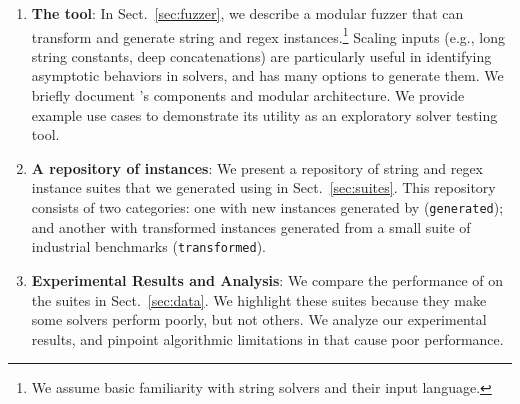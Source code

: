 \begin{enumerate}
    \item \textbf{The \fuzzer{} tool}:
        In Sect.~\ref{sec:fuzzer}, we describe a modular fuzzer that can
        transform and generate \smtfull{} string and regex
        instances.\footnote{We assume basic
        familiarity with string solvers and their input
        language.} Scaling inputs (e.g., long string constants,
        deep concatenations) are particularly useful in identifying asymptotic
        behaviors in solvers, and \fuzzer{} has many options to generate them.
        We briefly document \fuzzer{}'s components and modular architecture.
        We provide example use cases to demonstrate its utility as an
        exploratory solver testing tool.

    \item \textbf{A repository of \smtfull{} instances}:
        We present a repository of \smtfull{} string and regex instance suites
        that we generated using \fuzzer{} in Sect.~\ref{sec:suites}. This
        repository consists of two categories: one with new
        instances generated by \fuzzer{} (\texttt{generated}); and another with
        transformed instances generated from a small suite of industrial
        benchmarks (\texttt{transformed}).

    \item \textbf{Experimental Results and Analysis}:
        We compare the performance of \theSolvers{} on the
        \fuzzer{} suites \theSuites{} in Sect.~\ref{sec:data}. We
        highlight these suites because they make some solvers perform poorly,
        but not others. We analyze our
        experimental results, and pinpoint algorithmic limitations
        in \us{} that cause poor performance.
\end{enumerate}
